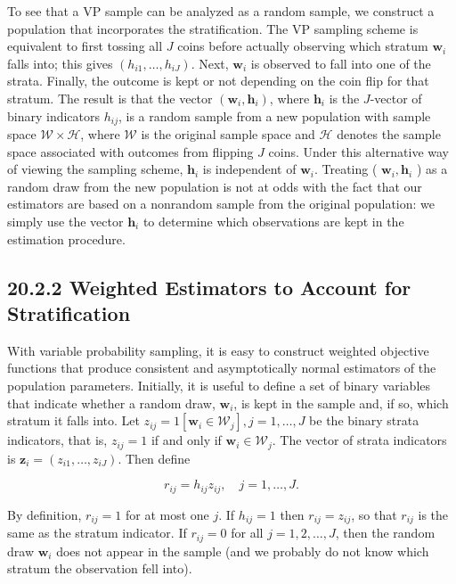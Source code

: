 \documentclass[10pt]{article}
\begin{document}
To see that a VP sample can be analyzed as a random sample, we construct a population that incorporates the stratification. The VP sampling scheme is equivalent to first tossing all $J$ coins before actually observing which stratum $\mathbf{w}_{i}$ falls into; this gives $\left(h_{i 1}, \ldots, h_{i J}\right)$. Next, $\mathbf{w}_{i}$ is observed to fall into one of the strata. Finally, the outcome is kept or not depending on the coin flip for that stratum. The result is that the vector $\left(\mathbf{w}_{i}, \mathbf{h}_{i}\right)$, where $\mathbf{h}_{i}$ is the $J$-vector of binary indicators $h_{i j}$, is a random sample from a new population with sample space $\mathscr{W} \times \mathscr{H}$, where $\mathscr{W}$ is the original sample space and $\mathscr{H}$ denotes the sample space associated with outcomes from flipping $J$ coins. Under this alternative way of viewing the sampling scheme, $\mathbf{h}_{i}$ is independent of $\mathbf{w}_{i}$. Treating ( $\mathbf{w}_{i}, \mathbf{h}_{i}$ ) as a random draw from the new population is not at odds with the fact that our estimators are based on a nonrandom sample from the original population: we simply use the vector $\mathbf{h}_{i}$ to determine which observations are kept in the estimation procedure.

\subsection*{20.2.2 Weighted Estimators to Account for Stratification}
With variable probability sampling, it is easy to construct weighted objective functions that produce consistent and asymptotically normal estimators of the population parameters. Initially, it is useful to define a set of binary variables that indicate whether a random draw, $\mathbf{w}_{i}$, is kept in the sample and, if so, which stratum it falls into. Let $z_{i j}=1\left[\mathbf{w}_{i} \in \mathscr{W}_{j}\right], j=1, \ldots, J$ be the binary strata indicators, that is, $z_{i j}=1$ if and only if $\mathbf{w}_{i} \in \mathscr{W}_{j}$. The vector of strata indicators is $\mathbf{z}_{i}=\left(z_{i 1}, \ldots, z_{i J}\right)$. Then define


\begin{equation*}
r_{i j}=h_{i j} z_{i j}, \quad j=1, \ldots, J . \tag{20.1}
\end{equation*}


By definition, $r_{i j}=1$ for at most one $j$. If $h_{i j}=1$ then $r_{i j}=z_{i j}$, so that $r_{i j}$ is the same as the stratum indicator. If $r_{i j}=0$ for all $j=1,2, \ldots, J$, then the random draw $\mathbf{w}_{i}$ does not appear in the sample (and we probably do not know which stratum the observation fell into).
\end{document}
